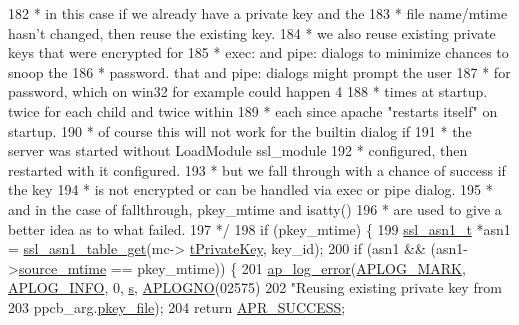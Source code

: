 \begin{DoxyCode}
{{182 \textcolor{comment}{     * in this case if we already have a private key and the}
183 \textcolor{comment}{     * file name/mtime hasn't changed, then reuse the existing key.}
184 \textcolor{comment}{     * we also reuse existing private keys that were encrypted for}
185 \textcolor{comment}{     * exec: and pipe: dialogs to minimize chances to snoop the}
186 \textcolor{comment}{     * password.  that and pipe: dialogs might prompt the user}
187 \textcolor{comment}{     * for password, which on win32 for example could happen 4}
188 \textcolor{comment}{     * times at startup.  twice for each child and twice within}
189 \textcolor{comment}{     * each since apache "restarts itself" on startup.}
190 \textcolor{comment}{     * of course this will not work for the builtin dialog if}
191 \textcolor{comment}{     * the server was started without LoadModule ssl\_module}
192 \textcolor{comment}{     * configured, then restarted with it configured.}
193 \textcolor{comment}{     * but we fall through with a chance of success if the key}
194 \textcolor{comment}{     * is not encrypted or can be handled via exec or pipe dialog.}
195 \textcolor{comment}{     * and in the case of fallthrough, pkey\_mtime and isatty()}
196 \textcolor{comment}{     * are used to give a better idea as to what failed.}
197 \textcolor{comment}{     */}
198     \textcolor{keywordflow}{if} (pkey\_mtime) \{
199         \hyperlink{structssl__asn1__t}{ssl\_asn1\_t} *asn1 = \hyperlink{group__MOD__SSL__PRIVATE_ga51df44abeb791f6d84a4b2d0391b7ccb}{ssl\_asn1\_table\_get}(mc->
      \hyperlink{structSSLModConfigRec_a6a0d1bba0a5cc5a5a9efbf59387313eb}{tPrivateKey}, key\_id);
200         \textcolor{keywordflow}{if} (asn1 && (asn1->\hyperlink{structssl__asn1__t_aae73a4b4725a985d1cdc4dbb8da0a049}{source\_mtime} == pkey\_mtime)) \{
201             \hyperlink{group__APACHE__CORE__LOG_ga5e6676c87418af7a1d323a116c78ecb4}{ap\_log\_error}(\hyperlink{group__APACHE__CORE__LOG_ga655e126996849bcb82e4e5a14c616f4a}{APLOG\_MARK}, \hyperlink{group__APACHE__CORE__LOG_ga47fafbef7e478babdd92e90407f95b19}{APLOG\_INFO}, 0, 
      \hyperlink{group__APACHE__CORE__LISTEN_ga9359ed159c8b295541e3770172d34550}{s}, \hyperlink{group__APACHE__CORE__LOG_ga1dee8a07e06bc5b3de8b89662c2cd666}{APLOGNO}(02575)
202                          \textcolor{stringliteral}{"Reusing existing private key from %
203                          ppcb\_arg.\hyperlink{structpphrase__cb__arg__t_afc01b5b93a45bd50c5aa697680921d65}{pkey\_file});
204             \textcolor{keywordflow}{return} \hyperlink{group__apr__errno_ga9ee311b7bf1c691dc521d721339ee2a6}{APR\_SUCCESS};
}}}
\end{DoxyCode}

